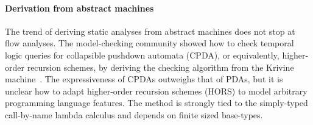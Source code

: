 \paragraph{Derivation from abstract machines}
The trend of deriving static analyses from abstract machines does not stop at flow analyses.
%
The model-checking community showed how to check temporal logic queries for collapsible pushdown automata (CPDA), or equivalently, higher-order recursion schemes, by deriving the checking algorithm from the Krivine machine~\citep{dvanhorn:Salvati2011Krivine}.
%
The expressiveness of CPDAs outweighs that of PDAs, but it is unclear how to adapt higher-order recursion schemes (HORS) to model arbitrary programming language features.
%
The method is strongly tied to the simply-typed call-by-name lambda calculus and depends on finite sized base-types.
%
